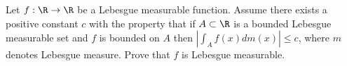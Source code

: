 Let $f:\R\rightarrow \R$ be a Lebesgue measurable function. Assume
there exists a positive constant $c$ with the property that if
$A\subset \R$ is a bounded Lebesgue measurable set and $f$ is bounded
on $A$ then $|\int_Af(x)dm(x)|\leq c$, where $m$ denotes Lebesgue
measure. Prove that $f$ is Lebesgue measurable.

